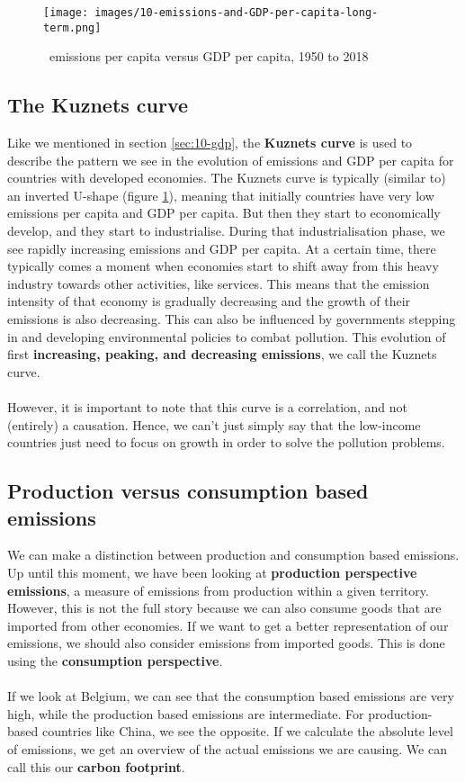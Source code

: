 \documentclass[../summary.tex]{subfiles}
\begin{document}
\begin{figure}[htbp]
	\centering
	\texttt{[image: images/10-emissions-and-GDP-per-capita-long-term.png]}
	\caption{\COtwo\ emissions per capita versus GDP per capita, 1950 to 2018}
	\label{fig:emissions-and-GDP-per-capita-long-term}
\end{figure}

\subsection{The Kuznets curve}

Like we mentioned in section \ref{sec:10-gdp}, the \textbf{Kuznets curve} is used to describe the pattern we see in the evolution of emissions and GDP per capita for countries with developed economies. The Kuznets curve is typically (similar to) an inverted U-shape (figure \ref{fig:emissions-and-GDP-per-capita-long-term}), meaning that initially countries have very low emissions per capita and GDP per capita. But then they start to economically develop, and they start to industrialise. During that industrialisation phase, we see rapidly increasing emissions and GDP per capita. At a certain time, there typically comes a moment when economies start to shift away from this heavy industry towards other activities, like services. This means that the emission intensity of that economy is gradually decreasing and the growth of their emissions is also decreasing. This can also be influenced by governments stepping in and developing environmental policies to combat pollution. This evolution of first \textbf{increasing, peaking, and decreasing emissions}, we call the Kuznets curve.
\\\\
However, it is important to note that this curve is a correlation, and not (entirely) a causation. Hence, we can't just simply say that the low-income countries just need to focus on growth in order to solve the pollution problems.
\newpage
\subsection{Production versus consumption based emissions}

We can make a distinction between production and consumption based emissions. Up until this moment, we have been looking at \textbf{production perspective emissions}, a measure of emissions from production within a given territory. However, this is not the full story because we can also consume goods that are imported from other economies. If we want to get a better representation of our emissions, we should also consider emissions from imported goods. This is done using the \textbf{consumption perspective}.
\\\\
If we look at Belgium, we can see that the consumption based emissions are very high, while the production based emissions are intermediate. For production-based countries like China, we see the opposite. If we calculate the absolute level of emissions, we get an overview of the actual emissions we are causing. We can call this our \textbf{carbon footprint}.
\end{document}

